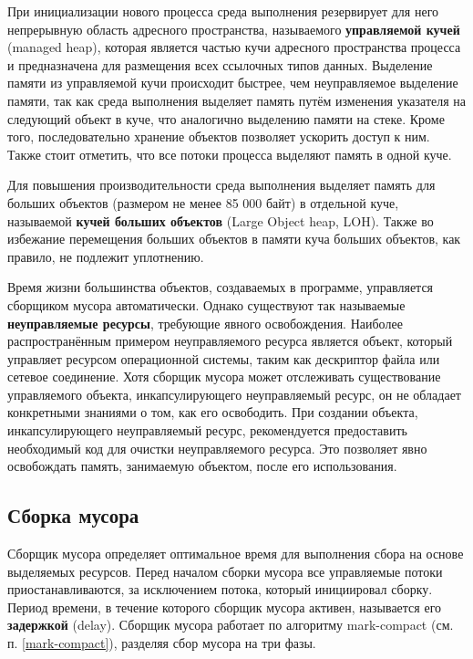 При инициализации нового процесса среда выполнения резервирует для него непрерывную область адресного пространства, называемого \textbf{управляемой кучей} (managed heap), которая является частью кучи адресного пространства процесса и предназначена для размещения всех ссылочных типов данных. Выделение памяти из управляемой кучи происходит быстрее, чем неуправляемое выделение памяти, так как среда выполнения выделяет память путём изменения указателя на следующий объект в куче, что аналогично выделению памяти на стеке. Кроме того, последовательно хранение объектов позволяет ускорить доступ к ним. Также стоит отметить, что все потоки процесса выделяют память в одной куче. \cite{dotnet_memory}

Для повышения производительности среда выполнения выделяет память для больших объектов (размером не менее 85 000 байт) в отдельной куче, называемой \textbf{кучей больших объектов} (Large Object heap, LOH). Также во избежание перемещения больших объектов в памяти куча больших объектов, как правило, не подлежит уплотнению. \cite{dotnet_loh}

Время жизни большинства объектов, создаваемых в программе, управляется сборщиком мусора автоматически. Однако существуют так называемые \textbf{неуправляемые ресурсы}, требующие явного освобождения. Наиболее распространённым примером неуправляемого ресурса является объект, который управляет ресурсом операционной системы, таким как дескриптор файла или сетевое соединение. Хотя сборщик мусора может отслеживать существование управляемого объекта, инкапсулирующего неуправляемый ресурс, он не обладает конкретными знаниями о том, как его освободить. При создании объекта, инкапсулирующего неуправляемый ресурс, рекомендуется предоставить необходимый код для очистки неуправляемого ресурса. Это позволяет явно освобождать память, занимаемую объектом, после его использования. \cite{dotnet_gc}



\subsection{Сборка мусора}

Сборщик мусора определяет оптимальное время для выполнения сбора на основе выделяемых ресурсов. Перед началом сборки мусора все управляемые потоки приостанавливаются, за исключением потока, который инициировал сборку. Период времени, в течение которого сборщик мусора активен, называется его \textbf{задержкой} (delay). Сборщик мусора работает по алгоритму mark-compact (см. п. \ref{mark-compact}), разделяя сбор мусора на три фазы. \cite{dotnet_gc}

